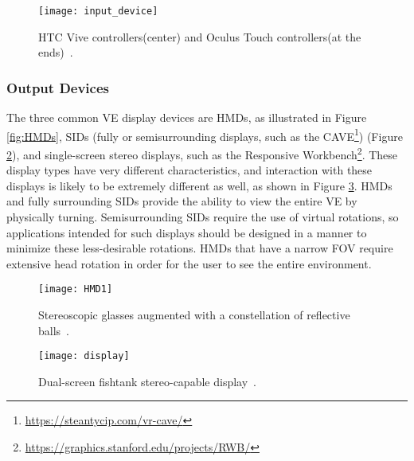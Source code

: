 \begin{figure}[h!]
    \centering
    \texttt{[image: input\_device]}
    \caption{HTC Vive controllers(center) and Oculus Touch controllers(at the ends)~\cite{article_input_devices}.}
    \label{fig:input_device}
\end{figure}


\subsubsection{Output Devices}
\label{sec:output_devices}

The three common \gls{VE} display devices are \glspl{HMD}, as illustrated in Figure \ref{fig:HMDs}, \glspl{SID} (fully or 
semisurrounding displays, such as the \gls{CAVE}\footnote{\url{https://steantycip.com/vr-cave/}}) (Figure \ref{fig:HMD1}), and single-screen stereo displays, such as the Responsive Workbench\footnote{\url{https://graphics.stanford.edu/projects/RWB/}}. 
These display types have very different characteristics, and interaction with these displays is likely to be extremely different as well, as shown in Figure \ref{fig:display}. \glspl{HMD} and fully surrounding \glspl{SID} provide the ability to view the entire \gls{VE} by physically turning. Semisurrounding \glspl{SID} require the use of virtual rotations, so applications intended for such 
displays should be designed in a manner to minimize these less-desirable rotations. \glspl{HMD} that have a narrow \gls{FOV} require extensive head rotation in order for the user to see the entire environment. 


\begin{figure}[h!]
    \centering
    \texttt{[image: HMD1]}
    \caption{Stereoscopic glasses augmented with a constellation of reflective balls~\cite{SHERMAN2019258}.} 
    \label{fig:HMD1}
\end{figure}

\begin{figure}[h!]
    \centering
    \texttt{[image: display]}
    \caption{Dual-screen fishtank stereo-capable display~\cite{SHERMAN2019258}.} 
    \label{fig:display}
\end{figure}

